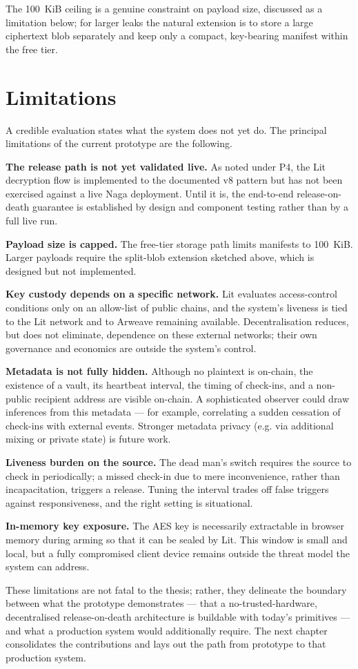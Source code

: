 The 100~KiB ceiling is a genuine constraint on payload size, discussed as a
limitation below; for larger leaks the natural extension is to store a large
ciphertext blob separately and keep only a compact, key-bearing manifest within the
free tier.

\section{Limitations}
\label{sec:eval-limitations}

A credible evaluation states what the system does not yet do. The principal
limitations of the current prototype are the following.

\textbf{The release path is not yet validated live.} As noted under P4, the Lit
decryption flow is implemented to the documented v8 pattern but has not been
exercised against a live Naga deployment. Until it is, the end-to-end
release-on-death guarantee is established by design and component testing rather
than by a full live run.

\textbf{Payload size is capped.} The free-tier storage path limits manifests to
100~KiB. Larger payloads require the split-blob extension sketched above, which is
designed but not implemented.

\textbf{Key custody depends on a specific network.} Lit evaluates access-control
conditions only on an allow-list of public chains, and the system's liveness is
tied to the Lit network and to Arweave remaining available. Decentralisation
reduces, but does not eliminate, dependence on these external networks; their own
governance and economics are outside the system's control.

\textbf{Metadata is not fully hidden.} Although no plaintext is on-chain, the
existence of a vault, its heartbeat interval, the timing of check-ins, and a
non-public recipient address are visible on-chain. A sophisticated observer could
draw inferences from this metadata --- for example, correlating a sudden cessation of
check-ins with external events. Stronger metadata privacy (e.g. via additional
mixing or private state) is future work.

\textbf{Liveness burden on the source.} The dead man's switch requires the source
to check in periodically; a missed check-in due to mere inconvenience, rather than
incapacitation, triggers a release. Tuning the interval trades off false triggers
against responsiveness, and the right setting is situational.

\textbf{In-memory key exposure.} The AES key is necessarily extractable in browser
memory during arming so that it can be sealed by Lit. This window is small and
local, but a fully compromised client device remains outside the threat model the
system can address.

These limitations are not fatal to the thesis; rather, they delineate the boundary
between what the prototype demonstrates --- that a no-trusted-hardware,
decentralised release-on-death architecture is buildable with today's primitives ---
and what a production system would additionally require. The next chapter
consolidates the contributions and lays out the path from prototype to that
production system.
